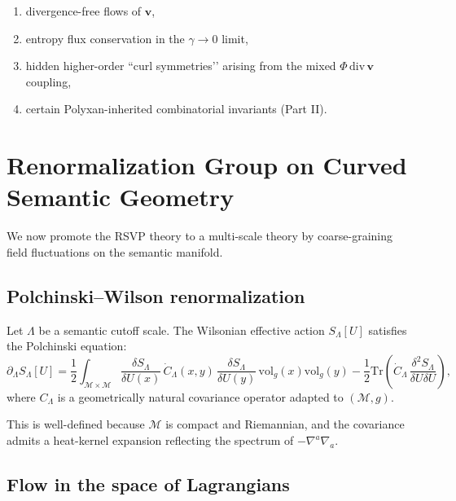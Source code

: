 \begin{enumerate}
  \item divergence-free flows of $\mathbf{v}$,
  \item entropy flux conservation in the $\gamma\to 0$ limit,
  \item hidden higher-order “curl symmetries’’ arising from the mixed
        $\Phi\,\mathrm{div}\,\mathbf{v}$ coupling,
  \item certain Polyxan-inherited combinatorial invariants (Part II).
\end{enumerate}

\section{Renormalization Group on Curved Semantic Geometry}

We now promote the RSVP theory to a multi-scale theory by coarse-graining field
fluctuations on the semantic manifold.

\subsection{Polchinski–Wilson renormalization}

Let $\Lambda$ be a semantic cutoff scale.  
The Wilsonian effective action $S_\Lambda[U]$ satisfies the Polchinski equation:
\begin{equation}
\label{eq:polchinski}
\partial_\Lambda S_\Lambda[U]
= \frac{1}{2} 
  \int_{\mathcal{M}\times\mathcal{M}}
  \frac{\delta S_\Lambda}{\delta U(x)}
  \, \dot{C}_\Lambda(x,y)\,
  \frac{\delta S_\Lambda}{\delta U(y)}
  \, \mathrm{vol}_g(x)\mathrm{vol}_g(y)
 - \frac{1}{2}
  \mathrm{Tr}\!\left(
    \dot{C}_\Lambda \,
    \frac{\delta^2 S_\Lambda}{\delta U \delta U}
  \right),
\end{equation}
where $C_\Lambda$ is a geometrically natural covariance operator adapted to
$(\mathcal{M},g)$.

This is well-defined because $\mathcal{M}$ is compact and Riemannian, and the
covariance admits a heat-kernel expansion reflecting the spectrum of
$-\nabla^a\nabla_a$.

\subsection{Flow in the space of Lagrangians}

